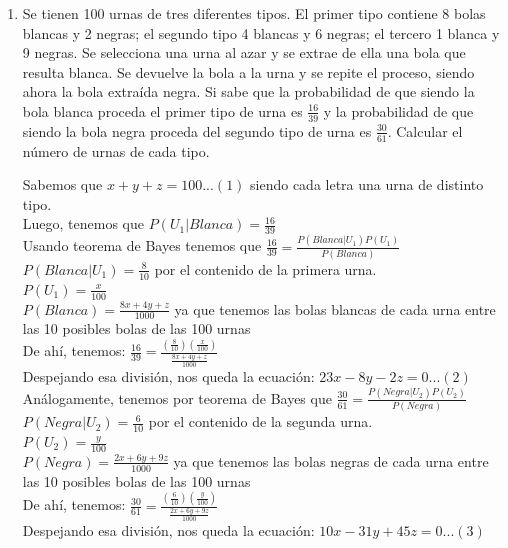 \documentclass[12pt,a4paper]{report}
\begin{document}
\begin{enumerate}
{\begin{enumerate}[label=\alph*) ]
{   }




	\end{enumerate}

	}

   \item {
  	Se tienen 100 urnas de tres diferentes tipos. El primer tipo contiene 8 bolas blancas y 2 negras; el segundo tipo 4 blancas y 6 negras; el tercero 1 blanca y 9 negras. Se selecciona una urna al azar y se extrae de ella una bola que resulta blanca. Se devuelve la bola a la urna y se repite el proceso, siendo ahora la bola extraída negra. Si sabe que la probabilidad de que siendo la bola blanca proceda el primer tipo de urna es $\frac{16}{39}$ y la probabilidad de que siendo la bola negra proceda del segundo tipo de urna es $  \frac{30}{61}$. Calcular el número de urnas de cada tipo.

Sabemos que $x + y + z = 100 ...(1)$ siendo cada letra una urna de distinto tipo.\\

Luego, tenemos que $P(U_{1} | Blanca) = \frac{16}{39}$ \\
Usando teorema de Bayes tenemos que $\frac{16}{39} = \frac{P(Blanca| U_{1})P(U_{1})}{P(Blanca)}$\\
$P(Blanca| U_{1}) = \frac{8}{10}$ por el contenido de la primera urna.\\
$P(U_{1}) = \frac{x}{100}$\\
$P(Blanca) = \frac{8x +4y +z}{1000}$ ya que tenemos las bolas blancas de cada urna entre las 10 posibles bolas de las 100 urnas\\
De ahí, tenemos: $\frac{16}{39} = \frac{(\frac{8}{10})(\frac{x}{100})}{\frac{8x +4y +z}{1000}}$\\
Despejando esa división, nos queda la ecuación: $23x -8y-2z = 0 ...(2)$\\

Análogamente, tenemos por teorema de Bayes que $\frac{30}{61} = \frac{P(Negra| U_{2})P(U_{2})}{P(Negra)}$\\
$P(Negra| U_{2}) = \frac{6}{10}$ por el contenido de la segunda urna.\\
$P(U_{2}) = \frac{y}{100}$\\
$P(Negra) = \frac{2x + 6y +9z}{1000}$ ya que tenemos las bolas negras de cada urna entre las 10 posibles bolas de las 100 urnas\\
De ahí, tenemos: $\frac{30}{61} = \frac{(\frac{6}{10})(\frac{y}{100})}{\frac{2x +6y +9z}{1000}}$\\
Despejando esa división, nos queda la ecuación: $10x -31y +45z = 0 ...(3)$\\

}
\end{enumerate}
\end{document}
